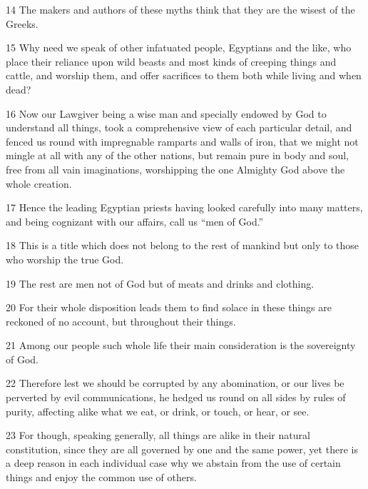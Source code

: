 \par 14 The makers and authors of these myths think that they are the wisest of the Greeks.

\par 15 Why need we speak of other infatuated people, Egyptians and the like, who place their reliance upon wild beasts and most kinds of creeping things and cattle, and worship them, and offer sacrifices to them both while living and when dead?

\par 16 Now our Lawgiver being a wise man and specially endowed by God to understand all things, took a comprehensive view of each particular detail, and fenced us round with impregnable ramparts and walls of iron, that we might not mingle at all with any of the other nations, but remain pure in body and soul, free from all vain imaginations, worshipping the one Almighty God above the whole creation.

\par 17 Hence the leading Egyptian priests having looked carefully into many matters, and being cognizant with our affairs, call us “men of God.”

\par 18 This is a title which does not belong to the rest of mankind but only to those who worship the true God.

\par 19 The rest are men not of God but of meats and drinks and clothing.

\par 20 For their whole disposition leads them to find solace in these things are reckoned of no account, but throughout their things.

\par 21 Among our people such whole life their main consideration is the sovereignty of God.

\par 22 Therefore lest we should be corrupted by any abomination, or our lives be perverted by evil communications, he hedged us round on all sides by rules of purity, affecting alike what we eat, or drink, or touch, or hear, or see.

\par 23 For though, speaking generally, all things are alike in their natural constitution, since they are all governed by one and the same power, yet there is a deep reason in each individual case why we abstain from the use of certain things and enjoy the common use of others.

